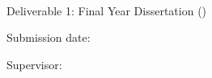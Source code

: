 

\makeatletter

\begin{titlepage}
  \begin{center} 
    \begin{huge}    
      \textsc{\@title}
    \end{huge} \\
    \textsf{Deliverable 1: Final Year Dissertation (\@degree)}
  \end{center}
    
  \bigskip\bigskip
        
  \begin{center}
    \begin{Large}
      \textbf{\@author}
    \end{Large}
  \end{center}
    
  \vfill
    
  \begin{Large}
    \noindent Submission date: {\@date}
    
    \vspace{1.5ex}
    
    \noindent Supervisor: {\@supervisor}
  \end{Large}
    
\end{titlepage}

\makeatother

